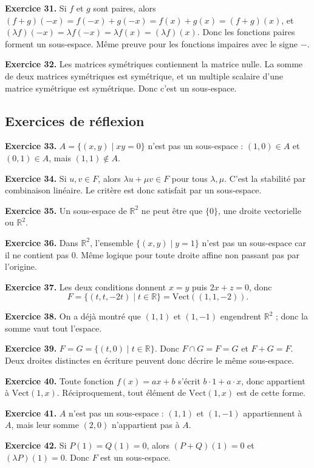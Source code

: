 \documentclass[11pt,a4paper]{article}
\newcommand{\R}{\mathbb R}
\newcommand{\Vect}{\mathrm{Vect}}
\begin{document}
\textbf{Exercice 31.} Si $f$ et $g$ sont paires, alors $(f+g)(-x)=f(-x)+g(-x)=f(x)+g(x)=(f+g)(x)$, et $(\lambda f)(-x)=\lambda f(-x)=\lambda f(x)=(\lambda f)(x)$. Donc les fonctions paires forment un sous-espace. Même preuve pour les fonctions impaires avec le signe $-$.

\textbf{Exercice 32.} Les matrices symétriques contiennent la matrice nulle. La somme de deux matrices symétriques est symétrique, et un multiple scalaire d'une matrice symétrique est symétrique. Donc c'est un sous-espace.

\subsection*{Exercices de réflexion}
\textbf{Exercice 33.} $A=\{(x,y)\mid xy=0\}$ n'est pas un sous-espace : $(1,0)\in A$ et $(0,1)\in A$, mais $(1,1)\notin A$.

\textbf{Exercice 34.} Si $u,v\in F$, alors $\lambda u+\mu v\in F$ pour tous $\lambda,\mu$. C'est la stabilité par combinaison linéaire. Le critère est donc satisfait par un sous-espace.

\textbf{Exercice 35.} Un sous-espace de $\R^2$ ne peut être que $\{0\}$, une droite vectorielle ou $\R^2$.

\textbf{Exercice 36.} Dans $\R^2$, l'ensemble $\{(x,y)\mid y=1\}$ n'est pas un sous-espace car il ne contient pas $0$. Même logique pour toute droite affine non passant pas par l'origine.

\textbf{Exercice 37.} Les deux conditions donnent $x=y$ puis $2x+z=0$, donc
\[F=\{(t,t,-2t)\mid t\in\R\}=\Vect((1,1,-2)).\]

\textbf{Exercice 38.} On a déjà montré que $(1,1)$ et $(1,-1)$ engendrent $\R^2$ ; donc la somme vaut tout l'espace.

\textbf{Exercice 39.} $F=G=\{(t,0)\mid t\in\R\}$. Donc $F\cap G=F=G$ et $F+G=F$. Deux droites distinctes en écriture peuvent donc décrire le même sous-espace.

\textbf{Exercice 40.} Toute fonction $f(x)=ax+b$ s'écrit $b\cdot 1+a\cdot x$, donc appartient à $\Vect(1,x)$. Réciproquement, tout élément de $\Vect(1,x)$ est de cette forme.

\textbf{Exercice 41.} $A$ n'est pas un sous-espace : $(1,1)$ et $(1,-1)$ appartiennent à $A$, mais leur somme $(2,0)$ n'appartient pas à $A$.

\textbf{Exercice 42.} Si $P(1)=Q(1)=0$, alors $(P+Q)(1)=0$ et $(\lambda P)(1)=0$. Donc $F$ est un sous-espace.
\end{document}
